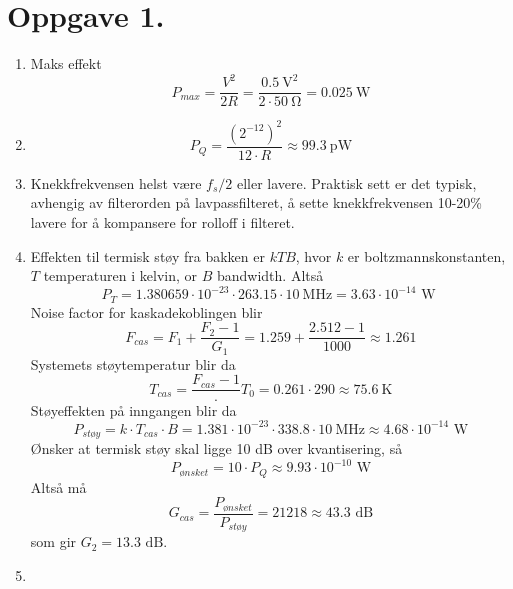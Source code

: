 \documentclass[a4paper,11pt,norsk]{article}
\begin{document}


\section*{Oppgave 1.}
\begin{enumerate}
    \item Maks effekt 
        \[
            P_{max} = \frac{V^2}{2R} = \frac{\SI{0.5}{\volt}^2}{2 \cdot \SI{50}{\ohm}} = \SI{0.025}{\watt}
        \]
    \item 
        \[
            P_Q = \frac{(2^{-12})^2}{12 \cdot R} \approx \SI{99.3}{\pico\watt}
        \]
    \item Knekkfrekvensen helst være $f_s / 2$ eller lavere. Praktisk sett er det typisk, avhengig av filterorden på 
        lavpassfilteret, å sette knekkfrekvensen 10-20\% lavere for å kompansere for rolloff i filteret.
    \item Effekten til termisk støy fra bakken er $kTB$, hvor $k$ er boltzmannskonstanten, $T$ temperaturen i kelvin, or $B$ bandwidth. Altså
        \[
            P_T = 1.380659 \cdot 10^{-23} \cdot 263.15 \cdot \SI{10}{\mega\hertz} = 3.63 \cdot 10^{-14} \text{ W } 
        \]
         Noise factor for kaskadekoblingen blir
         \[
             F_{cas} = F_1 + \frac{F_2 - 1}{G_1} = 1.259 + \frac{2.512-1}{1000} \approx 1.261
         \]
         Systemets støytemperatur blir da
         \[
             T_{cas} = \frac{F_{cas} - 1} \cdot T_0 = 0.261 \cdot 290 \approx \SI{75.6}{\kelvin}
         \]
         Støyeffekten på inngangen blir da
         \[
             P_{støy} = k \cdot T_{cas} \cdot B = 1.381 \cdot 10^{-23} \cdot 338.8 \cdot \SI{10}{\mega\hertz} \approx 4.68 \cdot 10^{-14} \text{ W}
         \]
         Ønsker at termisk støy skal ligge 10 dB over kvantisering, så
         \[
             P_{ønsket} = 10 \cdot P_Q \approx 9.93 \cdot 10^{-10} \text{ W}
         \]
         Altså må
         \[
             G_{cas} = \frac{P_{ønsket}}{P_{støy}} = 21218 \approx 43.3 \text{ dB}
         \]
         som gir $G_2 = 13.3 \text{ dB}$.
    \item
\end{enumerate}
\end{document}

